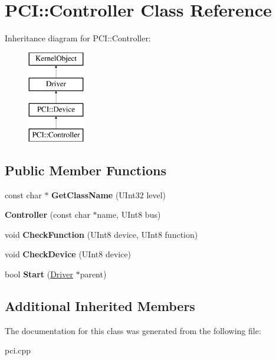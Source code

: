 \hypertarget{class_p_c_i_1_1_controller}{}\section{P\+CI\+:\+:Controller Class Reference}
\label{class_p_c_i_1_1_controller}
Inheritance diagram for P\+CI\+:\+:Controller\+:\begin{figure}[H]
\begin{center}
\leavevmode
\includegraphics[height=4.000000cm]{class_p_c_i_1_1_controller}
\end{center}
\end{figure}
\subsection*{Public Member Functions}
\begin{DoxyCompactItemize}
\item 
\mbox{\label{class_p_c_i_1_1_controller_a133af638b6cc15a6315301513e630b5e}} 
const char $\ast$ {\bfseries Get\+Class\+Name} (U\+Int32 level)
\item 
\mbox{\label{class_p_c_i_1_1_controller_ab0998cb0f4ed2cf295a9d386eb66d0ea}} 
{\bfseries Controller} (const char $\ast$name, U\+Int8 bus)
\item 
\mbox{\label{class_p_c_i_1_1_controller_a82cf80c754e99e4b0c5355957d106678}} 
void {\bfseries Check\+Function} (U\+Int8 device, U\+Int8 function)
\item 
\mbox{\label{class_p_c_i_1_1_controller_a68d664ef4a7742d1b87d9364147775ca}} 
void {\bfseries Check\+Device} (U\+Int8 device)
\item 
\mbox{\label{class_p_c_i_1_1_controller_a34391006bc15867b4e76ba1c8bb8bc23}} 
bool {\bfseries Start} (\hyperlink{class_driver}{Driver} $\ast$parent)
\end{DoxyCompactItemize}
\subsection*{Additional Inherited Members}


The documentation for this class was generated from the following file\+:\begin{DoxyCompactItemize}
\item 
pci.\+cpp\end{DoxyCompactItemize}
